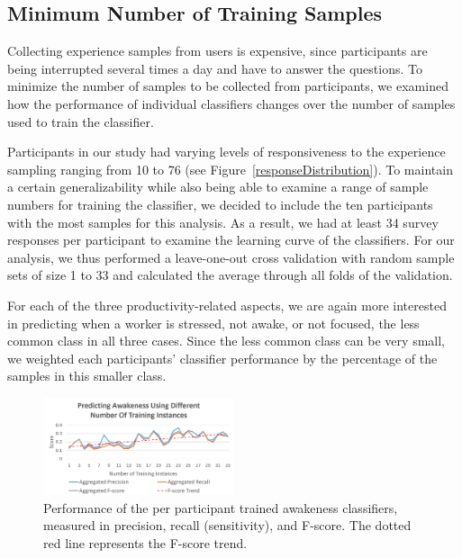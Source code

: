 
\subsection{Minimum Number of Training Samples}\label{secLearningCurve}
Collecting experience samples from users is expensive, since participants are being interrupted several times a day and have to answer the questions. To minimize the number of samples to be collected from participants, we examined how the performance of individual classifiers changes over the number of samples used to train the classifier.

Participants in our study had varying levels of responsiveness to the experience sampling ranging from 10 to 76 (see Figure~\ref{responseDistribution}). To maintain a certain generalizability while also being able to examine a range of sample numbers for training the classifier, we decided to include the ten participants with the most samples for this analysis. As a result, we had at least 34 survey responses per participant to examine the learning curve of the classifiers. For our analysis, we thus performed a leave-one-out cross validation with random sample sets of size 1 to 33 and calculated the average through all folds of the validation.

For each of the three productivity-related aspects, we are again more interested in predicting when a worker is stressed, not awake, or not focused, the less common class in all three cases. Since the less common class can be very small, we weighted each participants' classifier performance by the percentage of the samples in this smaller class.


\begin{figure}
  \centering
          \includegraphics[width=0.5\textwidth]{20180912AwakenessLC2.png}
  \caption{Performance of the per participant trained awakeness classifiers, measured in precision, recall (sensitivity), and F-score. The dotted red line represents the F-score trend.}\label{fig:learningCurveInd}
  \vspace*{-3mm}
\end{figure}

